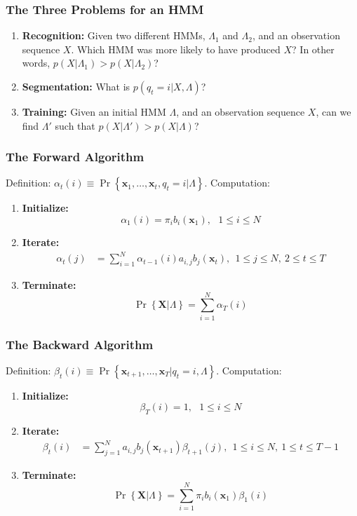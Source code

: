 \documentclass{beamer}
\begin{document}
\begin{frame}
  \frametitle{The Three Problems for an HMM}

  \begin{enumerate}
  \item {\bf Recognition:} Given two different HMMs, $\Lambda_1$ and
    $\Lambda_2$, and an observation sequence $X$.  Which HMM was more
    likely to have produced $X$?  In other words, 
    $p(X|\Lambda_1)>p(X|\Lambda_2)$?
  \item {\bf Segmentation:} What is $p(q_t=i|X,\Lambda)$?
  \item {\bf Training:} Given an initial HMM $\Lambda$, and an
    observation sequence $X$, can we find $\Lambda'$ such that
    $p(X|\Lambda') > p(X|\Lambda)$?
  \end{enumerate}
\end{frame}

\begin{frame}
  \frametitle{The Forward Algorithm}

  Definition:
  $\alpha_t(i)\equiv\Pr\left\{\mathbf{x}_1,\ldots,\mathbf{x}_t,q_t=i|\Lambda\right\}$.
  Computation:
  \begin{enumerate}
  \item {\bf Initialize:}
    \[
    \alpha_1(i) = \pi_i b_i(\mathbf{x}_1),~~~1\le i\le N
    \]
  \item {\bf Iterate:}
    \begin{align*}
      \alpha_{t}(j) &= \sum_{i=1}^N \alpha_{t-1}(i) a_{i,j}b_j(\mathbf{x}_t),~~1\le j\le N,~2\le t\le T
    \end{align*}
  \item {\bf Terminate:}
    \[
    \Pr\left\{\mathbf{X}|\Lambda\right\} = \sum_{i=1}^N \alpha_T(i)
    \]
  \end{enumerate}
\end{frame}
  
\begin{frame}
  \frametitle{The Backward Algorithm}

  Definition: $\beta_t(i) \equiv
  \Pr\left\{\mathbf{x}_{t+1},\ldots,\mathbf{x}_T|q_t=i,\Lambda\right\}$.
  Computation:
  \begin{enumerate}
  \item {\bf Initialize:}
    \[
    \beta_T(i) = 1,~~~1\le i\le N
    \]
  \item {\bf Iterate:}
    \begin{align*}
      \beta_{t}(i) &= \sum_{j=1}^N a_{i,j}b_j(\mathbf{x}_{t+1})\beta_{t+1}(j),~~1\le i\le N,~1\le t\le T-1
    \end{align*}
  \item {\bf Terminate:}
    \[
    \Pr\left\{\mathbf{X}|\Lambda\right\} = \sum_{i=1}^N \pi_ib_i(\mathbf{x}_1)\beta_1(i)
    \]
  \end{enumerate}
\end{frame}
\end{document}
